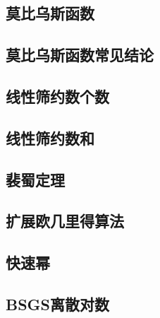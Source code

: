 \documentclass[10pt,a4paper]{article}
\begin{document}
\subsection{莫比乌斯函数}
\begin{spacing}{1.5}

\end{spacing}

\subsection{莫比乌斯函数常见结论}
\begin{spacing}{1.5}

\end{spacing}
\subsection{线性筛约数个数}
\begin{spacing}{1.5}

\end{spacing}

\subsection{线性筛约数和}
\begin{spacing}{1.5}

\end{spacing}

\subsection{裴蜀定理}
\begin{spacing}{1.5}

\end{spacing}
\subsection{扩展欧几里得算法}
\begin{spacing}{1.5}

\end{spacing}

\subsection{快速幂}

\subsection{BSGS离散对数}

\end{document}
